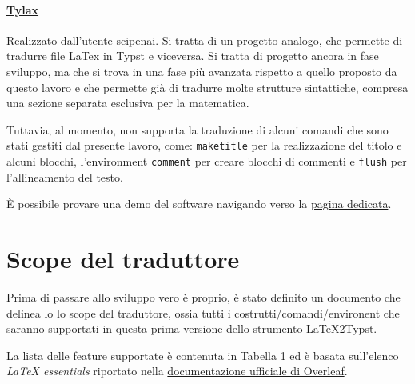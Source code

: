 \documentclass{article}
\begin{document}
    \paragraph{\href{https://github.com/scipenai/tylax}{Tylax}}

    Realizzato dall'utente \href{https://github.com/scipenai}{scipenai}. Si tratta di un progetto analogo, che permette di tradurre file LaTex in Typst e viceversa. Si tratta di progetto ancora in fase sviluppo, ma che si trova in una fase più avanzata rispetto a quello proposto da questo lavoro e che permette già di tradurre molte strutture sintattiche, compresa una sezione separata esclusiva per la matematica.

    Tuttavia, al momento, non supporta la traduzione di alcuni comandi che sono stati gestiti dal presente lavoro, come: \texttt{maketitle} per la realizzazione del titolo e alcuni blocchi, l'environment \texttt{comment} per creare blocchi di commenti e \texttt{flush} per l'allineamento del testo.

    È possibile provare una demo del software navigando verso la \href{https://convert.silkyai.cn}{pagina dedicata}.

    \section{Scope del traduttore}

    Prima di passare allo sviluppo vero è proprio, è stato definito un documento che delinea lo lo scope del traduttore, ossia tutti i costrutti/comandi/environent che saranno supportati in questa prima versione dello strumento LaTeX2Typst.

    La lista delle feature supportate è contenuta in Tabella 1 ed è basata sull'elenco \textit{LaTeX essentials} riportato nella \href{https://www.overleaf.com/learn}{documentazione ufficiale di Overleaf}.
\end{document}
